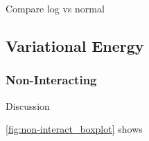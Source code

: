 Compare log vs normal

\subsection{Variational Energy}

\subsubsection{Non-Interacting}

Discussion

\autoref{fig:non-interact_boxplot} shows 

